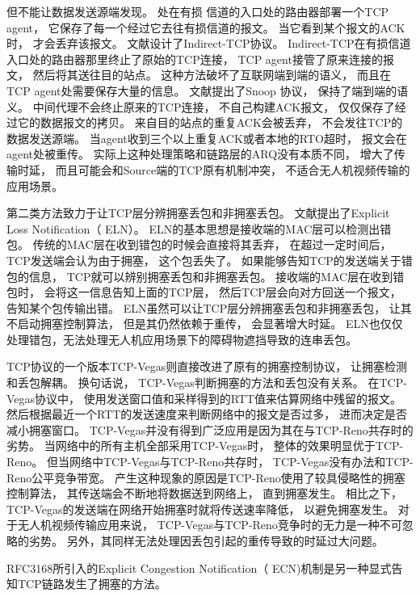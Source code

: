 但不能让数据发送源端发现。
处在有损 信道的入口处的路由器部署一个TCP agent，
它保存了每一个经过它去往有损信道的报文。
当它看到某个报文的ACK时，
才会丢弃该报文。
文献\cite{Bakre1995I}设计了Indirect-TCP协议。
Indirect-TCP在有损信道入口处的路由器那里终止了原始的TCP连接，
TCP agent接管了原来连接的报文，
然后将其送往目的站点。
这种方法破坏了互联网端到端的语义，
而且在TCP agent处需要保存大量的信息。
文献\cite{Balakrishnan1995Improving}提出了Snoop 协议，
保持了端到端的语义。
中间代理不会终止原来的TCP连接，
不自己构建ACK报文，
仅仅保存了经过它的数据报文的拷贝。
来自目的站点的重复ACK会被丢弃，
不会发往TCP的数据发送源端。
当agent收到三个以上重复ACK或者本地的RTO超时，
报文会在agent处被重传。
实际上这种处理策略和链路层的ARQ没有本质不同，
增大了传输时延，
而且可能会和Source端的TCP原有机制冲突，
不适合无人机视频传输的应用场景。
\par
第二类方法致力于让TCP层分辨拥塞丢包和非拥塞丢包。
文献\cite{buchholcz2003explicit}提出了Explicit Loss Notification（ ELN）。
ELN的基本思想是接收端的MAC层可以检测出错包。
传统的MAC层在收到错包的时候会直接将其丢弃，
在超过一定时间后，
TCP发送端会认为由于拥塞，
这个包丢失了。
如果能够告知TCP的发送端关于错包的信息，
TCP就可以辨别拥塞丢包和非拥塞丢包。
接收端的MAC层在收到错包时，
会将这一信息告知上面的TCP层，
然后TCP层会向对方回送一个报文，
告知某个包传输出错。
ELN虽然可以让TCP层分辨拥塞丢包和非拥塞丢包，
让其不启动拥塞控制算法，
但是其仍然依赖于重传，
会显著增大时延。
ELN也仅仅处理错包，无法处理无人机应用场景下的障碍物遮挡导致的连串丢包。
\par
TCP协议的一个版本TCP-Vegas\textsuperscript{\cite{brakmo1995tcp}}则直接改进了原有的拥塞控制协议，
让拥塞检测和丢包解耦。
换句话说，
TCP-Vegas判断拥塞的方法和丢包没有关系。
在TCP-Vegas协议中，
使用发送窗口值和采样得到的RTT值来估算网络中残留的报文。
然后根据最近一个RTT的发送速度来判断网络中的报文是否过多，
进而决定是否减小拥塞窗口。
TCP-Vegas并没有得到广泛应用是因为其在与TCP-Reno共存时的劣势。
当网络中的所有主机全部采用TCP-Vegas时，
整体的效果明显优于TCP-Reno。
但当网络中TCP-Vegas与TCP-Reno共存时，
TCP-Vegas没有办法和TCP-Reno公平竞争带宽。
产生这种现象的原因是TCP-Reno使用了较具侵略性的拥塞控制算法，
其传送端会不断地将数据送到网络上，
直到拥塞发生。
相比之下，
TCP-Vegas的发送端在网络开始拥塞时就将传送速率降低，
以避免拥塞发生。
对于无人机视频传输应用来说，
TCP-Vegas与TCP-Reno竞争时的无力是一种不可忽略的劣势。
另外，其同样无法处理因丢包引起的重传导致的时延过大问题。
\par
RFC3168所引入的Explicit Congestion Notification（ ECN)机制\textsuperscript{\cite{ramakrishnan2001rfc}}是另一种显式告知TCP链路发生了拥塞的方法。
